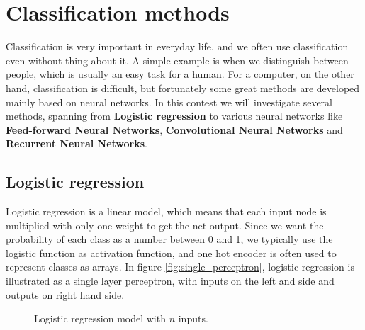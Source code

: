 \section{Classification methods} \label{sec:methods}
Classification is very important in everyday life, and we often use classification even without thing about it. A simple example is when we distinguish between people, which is usually an easy task for a human. For a computer, on the other hand, classification is difficult, but fortunately some great methods are developed mainly based on neural networks. In this contest we will investigate several methods, spanning from \textbf{Logistic regression} to various neural networks like \textbf{Feed-forward Neural Networks}, \textbf{Convolutional Neural Networks} and \textbf{Recurrent Neural Networks}. 

\subsection{Logistic regression}
Logistic regression is a linear model, which means that each input node is multiplied with only one weight to get the net output. Since we want the probability of each class as a number between 0 and 1, we typically use the logistic function as activation function, and one hot encoder is often used to represent classes as arrays. In figure \eqref{fig:single_perceptron}, logistic regression is illustrated as a single layer perceptron, with inputs on the left and side and outputs on right hand side. 

\begin{figure} [H]
	\centering
	\caption{Logistic regression model with $n$ inputs.}
	\label{fig:single_perceptron}
\end{figure}

